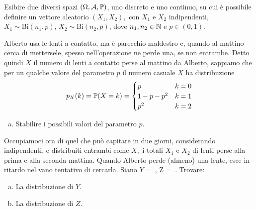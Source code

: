 \Esercizio{}

Esibire due diversi spazi $(\Omega,\mathcal{A},\mathbb{P})$, uno discreto e uno continuo, su cui è possibile definire un vettore aleatorio $(X_{1} ,X_{2}) ,$ con $X_{1}$ e $X_{2}$ indipendenti, $X_{1} \sim \mathrm{Bi}(n_{1} ,p)$, $X_{2} \sim \mathrm{Bi}(n_{2} ,p)$, dove $n_{1} ,n_{2} \in \mathbb{N}$ e $p\in (0,1)$.

\Esercizio{}

Alberto usa le lenti a contatto, ma è parecchio maldestro e, quando al mattino cerca di mettersele, spesso nell'operazione ne perde una, se non entrambe. Detto quindi $X$ il numero di lenti a contatto perse al mattino da Alberto, sappiamo che per un qualche valore del parametro $p$ il numero casuale $X$ ha distribuzione
\begin{equation*}
	p_{X} (k)=\mathbb{P} (X=k)=
	\begin{cases}
		p & k=0\\
		1-p-p^{2} & k=1\\
		p^{2} & k=2
	\end{cases}
\end{equation*}
\begin{enumerate}[a)]
	\item Stabilire i possibili valori del parametro $p$.
\end{enumerate}
Occupiamoci ora di quel che può capitare in due giorni, considerando indipendenti, e distribuiti entrambi come $X,$ i totali $X_{1}$ e $X_{2}$ di lenti perse alla prima e alla seconda mattina. Quando Alberto perde (almeno) una lente, esce in ritardo nel vano tentativo di cercarla. Siano $Y=$ , $\mathrm{Z} =$ . Trovare:
\begin{enumerate}[a),resume]
	\item La distribuzione di $Y$.
	\item La distribuzione di $Z$.
\end{enumerate}

\ParteSoluzioni

